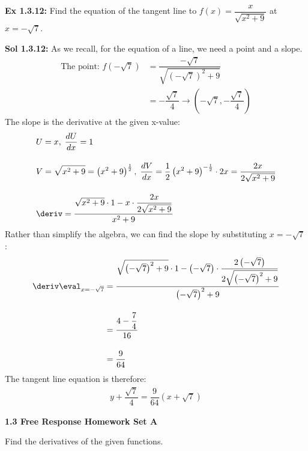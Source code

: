 \begin{tcolorbox}[example]
    \textbf{Ex 1.3.12: } Find the equation of the tangent line to $f(x) = \dfrac{x}{\sqrt{x^2 + 9}}$ at $x = -\sqrt{7}$.
\end{tcolorbox}
\begin{tcolorbox}[solution]
    \textbf{Sol 1.3.12: } As we recall, for the equation of a line, we need a point and a slope. \begin{align*}
        \text{The point: } f\left(-\sqrt{7}\right) & = \dfrac{-\sqrt{7}}{\sqrt{\left(-\sqrt{7}\right)^2 + 9}} \\[11pt]
        & = -\dfrac{\sqrt{7}}{4} \rightarrow \left(-\sqrt{7}, -\dfrac{\sqrt{7}}{4}\right) 
    \end{align*} 
    The slope is the derivative at the given x-value: \begin{align*}
        & U = x, \; \dfrac{dU}{dx} = 1 \\[11pt]
        & V = \sqrt{x^2 + 9} = \left(x^2 + 9\right)^\frac{1}{2}, \; \dfrac{dV}{dx} = \dfrac{1}{2}\left(x^2 + 9\right)^{-\frac{1}{2}} \cdot 2x = \dfrac{2x}{2\sqrt{x^2 + 9}} \\[11pt]
        & \deriv = \dfrac{\sqrt{x^2 + 9} \cdot 1 - x \cdot \dfrac{2x}{2\sqrt{x^2 + 9}}}{x^2 + 9} 
    \end{align*} 
    Rather than simplify the algebra, we can find the slope by substituting $x = -\sqrt{7}$: \begin{align*}
        \deriv \eval_{x = -\sqrt{7}} & = \dfrac{\sqrt{\left(-\sqrt{7}\right)^2 + 9} \cdot 1 - \left(-\sqrt{7}\right) \cdot \dfrac{2\left(-\sqrt{7}\right)}{2\sqrt{\left(-\sqrt{7}\right)^2 + 9}}}{\left(-\sqrt{7}\right)^2 + 9} \\[11pt]
        & = \dfrac{4 - \dfrac{7}{4}}{16} \\[11pt]
        & = \dfrac{9}{64}
    \end{align*} 
    The tangent line equation is therefore: \begin{align*}
        \boxed{y + \dfrac{\sqrt{7}}{4} = \dfrac{9}{64}\left(x + \sqrt{7}\right)} 
    \end{align*} 
\end{tcolorbox}

\newpage

\textbf{\large{1.3 Free Response Homework Set A}} \par

Find the derivatives of the given functions. \par

